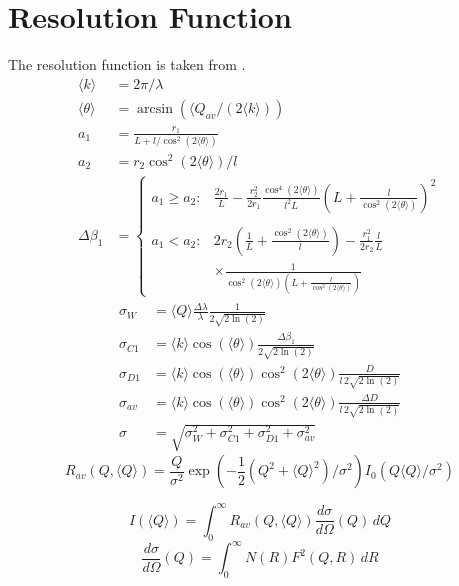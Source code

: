 \clearpage
\section{Resolution Function}
The resolution function is taken from \cite{Pedersen1990}.
\begin{align}
    \langle k\rangle      & = 2 \pi/\lambda \\
    \langle \theta\rangle  &= \arcsin(\langle Q_{av}/(2 \langle k\rangle )) \\
    a_1        &= \frac{r_1}{L+l/\cos^2(2\langle \theta\rangle )} \\
    a_2        &= r_2 \cos^2(2 \langle \theta\rangle )/l \\
    \Delta\beta_1 &=
       \begin{cases}
          a_1 \geq a_2: & \displaystyle \frac{2 r_1}{L} - \frac{r_2^2}{2 r_1}
          \frac{\cos^4(2\langle \theta\rangle )}{l^2L}
                          \left(L+\frac{l}{\cos^2(2\langle \theta\rangle )}\right)^2\\
                          ~
                          \\
          a_1 < a_2: & \displaystyle 2 r_2\left(\frac{1}{L} + \frac{\cos^2(2\langle \theta\rangle )}{l}\right)
                 - \frac{r_1^2}{2r_2}  \frac{l}{L} \\
                 & \displaystyle \times
                 \frac{1}{\cos^2(2\langle \theta\rangle ) \left(L+\frac{l}{\cos^2(2\langle \theta\rangle )}\right)}
       \end{cases}
\end{align}
\begin{align}
    \sigma_W  &= \langle Q\rangle \frac{\Delta\lambda}{\lambda}\frac{1}{2\sqrt{2\ln(2)}} \\
    \sigma_{C1} &= \langle k\rangle\cos(\langle \theta\rangle)\frac{\Delta\beta_1}{2\sqrt{2\ln(2)}}  \\
    \sigma_{D1} &= \langle k\rangle\cos(\langle \theta\rangle)\cos^2(2\langle \theta\rangle) \frac{D}{l \,2\sqrt{2\ln(2)}} \\
    \sigma_{av} &= \langle k\rangle\cos(\langle \theta\rangle)\cos^2(2\langle \theta\rangle) \frac{\Delta D}{l \,2\sqrt{2\ln(2)}} \\
    \sigma &= \sqrt{\sigma^2_W+\sigma^2_{C1}+\sigma^2_{D1}+\sigma^2_{av}}
\end{align}
\begin{equation}
R_{av}\left(Q,\langle Q\rangle\right) = \frac{Q}{\sigma^2}
 \exp\left( -\frac{1}{2}\left(Q^2+\langle Q\rangle^2\right)/\sigma^2\right)
 I_0(Q\langle Q\rangle/\sigma^2)
\end{equation}

\begin{equation}
I(\langle Q\rangle) = \int_0^\infty R_{av}\left(Q,\langle
Q\rangle\right) \frac{d\sigma}{d\Omega}(Q) \, dQ
\end{equation}
\begin{equation}
\frac{d\sigma}{d\Omega}(Q) = \int_0^\infty N(R) F^2(Q,R) \, dR
\end{equation}
